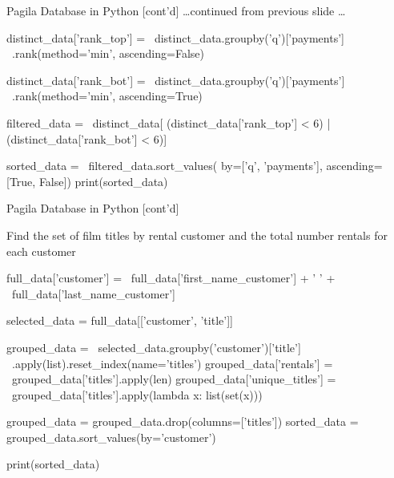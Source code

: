 \documentclass[ignorenonframetext,xcolor=x11names]{beamer}
\begin{document}
\begin{frame}[fragile]{Pagila Database in Python \small [cont'd]}
\ldots continued from previous slide \ldots

\footnotesize
\begin{pythoncode}
distinct_data['rank_top'] = \
    distinct_data.groupby('q')['payments'] \
    .rank(method='min', ascending=False)
    
distinct_data['rank_bot'] = \
    distinct_data.groupby('q')['payments'] \
    .rank(method='min', ascending=True)
    
filtered_data = \
    distinct_data[
        (distinct_data['rank_top'] < 6) | 
        (distinct_data['rank_bot'] < 6)]
        
sorted_data = \
    filtered_data.sort_values(
        by=['q', 'payments'], 
        ascending=[True, False])
print(sorted_data)
\end{pythoncode}
\end{frame}


\begin{frame}[fragile]{Pagila Database in Python \small [cont'd]}

Find the set of film titles by rental customer and the total number rentals for each customer

\scriptsize
\begin{pythoncode}
full_data['customer'] = \
    full_data['first_name_customer'] + ' ' + \
    full_data['last_name_customer']

selected_data = full_data[['customer', 'title']]

grouped_data = \
    selected_data.groupby('customer')['title'] \
        .apply(list).reset_index(name='titles')
grouped_data['rentals'] = \
     grouped_data['titles'].apply(len)
grouped_data['unique_titles'] = \
     grouped_data['titles'].apply(lambda x: list(set(x)))

grouped_data = grouped_data.drop(columns=['titles'])
sorted_data = grouped_data.sort_values(by='customer')

print(sorted_data)
\end{pythoncode}
\end{frame}
\end{document}
